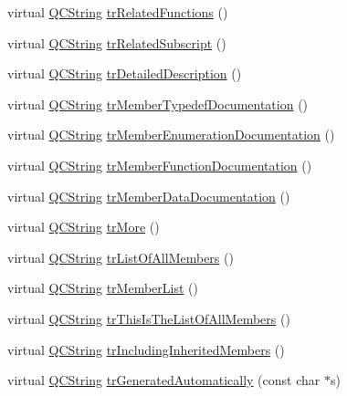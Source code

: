 \begin{DoxyCompactItemize}
\item 
virtual \hyperlink{class_q_c_string}{Q\-C\-String} \hyperlink{class_translator_slovak_a9cdd41a0b3211b9f7f156ddf0176e848}{tr\-Related\-Functions} ()
\item 
virtual \hyperlink{class_q_c_string}{Q\-C\-String} \hyperlink{class_translator_slovak_a122dc85b3ca735f9344e86cdea420442}{tr\-Related\-Subscript} ()
\item 
virtual \hyperlink{class_q_c_string}{Q\-C\-String} \hyperlink{class_translator_slovak_a3b56ac2f0285e4ca64e85fe42b3b6510}{tr\-Detailed\-Description} ()
\item 
virtual \hyperlink{class_q_c_string}{Q\-C\-String} \hyperlink{class_translator_slovak_af1e0f39dbc5f29620b3654646530b7e1}{tr\-Member\-Typedef\-Documentation} ()
\item 
virtual \hyperlink{class_q_c_string}{Q\-C\-String} \hyperlink{class_translator_slovak_a9ac93f67124761e42466a1d44bff46a7}{tr\-Member\-Enumeration\-Documentation} ()
\item 
virtual \hyperlink{class_q_c_string}{Q\-C\-String} \hyperlink{class_translator_slovak_aa033beeb0850c3146fcea2aa5252b4ba}{tr\-Member\-Function\-Documentation} ()
\item 
virtual \hyperlink{class_q_c_string}{Q\-C\-String} \hyperlink{class_translator_slovak_a147916b8e7bfa480c305c89296a30b27}{tr\-Member\-Data\-Documentation} ()
\item 
virtual \hyperlink{class_q_c_string}{Q\-C\-String} \hyperlink{class_translator_slovak_ad353f5016f330b5494c0722bd412e7da}{tr\-More} ()
\item 
virtual \hyperlink{class_q_c_string}{Q\-C\-String} \hyperlink{class_translator_slovak_a40c25671c7d3213108dc1b8d2b916a8e}{tr\-List\-Of\-All\-Members} ()
\item 
virtual \hyperlink{class_q_c_string}{Q\-C\-String} \hyperlink{class_translator_slovak_a5f788c561be2a2386720266688ad7561}{tr\-Member\-List} ()
\item 
virtual \hyperlink{class_q_c_string}{Q\-C\-String} \hyperlink{class_translator_slovak_a011ff392bb2087e2804dc648db7b3bdd}{tr\-This\-Is\-The\-List\-Of\-All\-Members} ()
\item 
virtual \hyperlink{class_q_c_string}{Q\-C\-String} \hyperlink{class_translator_slovak_ae6babe31ac1979ada5737392536bd239}{tr\-Including\-Inherited\-Members} ()
\item 
virtual \hyperlink{class_q_c_string}{Q\-C\-String} \hyperlink{class_translator_slovak_a25156a73baa8406a915eaa5a6824b359}{tr\-Generated\-Automatically} (const char $\ast$s)

\end{DoxyCompactItemize}
